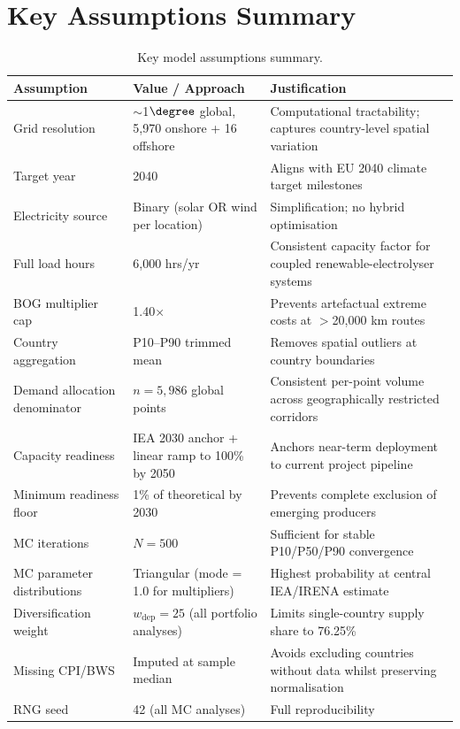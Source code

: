 \section{Key Assumptions Summary}
\label{sec:assumptions}

\begin{table}[htbp]
    \centering
    \caption{Key model assumptions summary.}
    \label{tab:assumptions}
    \small
    \begin{tabular}{p{4cm}p{4cm}p{6cm}}
        \toprule
        Assumption & Value / Approach & Justification \\
        \midrule
        Grid resolution & $\sim$1$\degree$ global, 5{,}970 onshore + 16 offshore & Computational tractability; captures country-level spatial variation \\
        Target year & 2040 & Aligns with EU 2040 climate target milestones \\
        Electricity source & Binary (solar OR wind per location) & Simplification; no hybrid optimisation \\
        Full load hours & 6{,}000 hrs/yr & Consistent capacity factor for coupled renewable-electrolyser systems \\
        BOG multiplier cap & 1.40$\times$ & Prevents artefactual extreme costs at $>$20{,}000 km routes \\
        Country aggregation & P10--P90 trimmed mean & Removes spatial outliers at country boundaries \\
        Demand allocation denominator & $n = 5{,}986$ global points & Consistent per-point volume across geographically restricted corridors \\
        Capacity readiness & IEA 2030 anchor + linear ramp to 100\% by 2050 & Anchors near-term deployment to current project pipeline \\
        Minimum readiness floor & 1\% of theoretical by 2030 & Prevents complete exclusion of emerging producers \\
        MC iterations & $N = 500$ & Sufficient for stable P10/P50/P90 convergence \\
        MC parameter distributions & Triangular (mode = 1.0 for multipliers) & Highest probability at central IEA/IRENA estimate \\
        Diversification weight & $w_{\text{dep}} = 25$ (all portfolio analyses) & Limits single-country supply share to 76.25\% \\
        Missing CPI/BWS & Imputed at sample median & Avoids excluding countries without data whilst preserving normalisation \\
        RNG seed & 42 (all MC analyses) & Full reproducibility \\
        \bottomrule
    \end{tabular}
\end{table}
